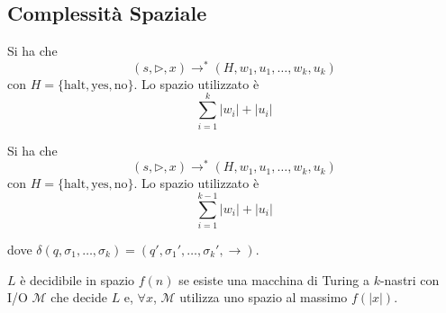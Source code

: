 \subsection{Complessità Spaziale}
\begin{definition}
    Si ha che
    $$
        (s,\rhd,x) \to^* (H,w_1,u_1,\dots,w_k,u_k)
    $$
    con $H=\{\text{halt},\text{yes},\text{no}\}$. Lo spazio utilizzato è
    $$
        \sum_{i=1}^k |w_i| + |u_i|
    $$
\end{definition}

\begin{definition}
    Si ha che
    $$
        (s,\rhd,x) \to^* (H,w_1,u_1,\dots,w_k,u_k)
    $$
    con $H=\{\text{halt},\text{yes},\text{no}\}$. Lo spazio utilizzato è
    $$
        \sum_{i=1}^{k-1} |w_i| + |u_i|
    $$
\end{definition}
dove $\delta(q,\sigma_1,\dots,\sigma_k)=(q',\sigma_1',\dots,\sigma_k',\to)$.

\begin{definition}
    $L$ è decidibile in spazio $f(n)$ se esiste una macchina di Turing a $k$-nastri con I/O $\mathcal{M}$ che decide $L$ e, $\forall x$, $\mathcal{M}$ utilizza uno spazio al massimo $f(|x|)$.
\end{definition}

